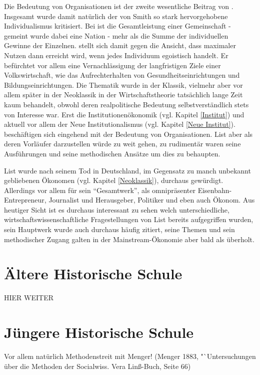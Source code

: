 Die Bedeutung von Organisationen ist der zweite wesentliche Beitrag von \textcite{List1841}. Insgesamt wurde damit natürlich der von Smith so stark hervorgehobene Individualismus kritisiert. Bei \textcite{List1841} ist die Gesamtleistung einer Gemeinschaft - gemeint wurde dabei eine Nation - mehr als die Summe der individuellen Gewinne der Einzelnen.  \textcite{List1841} stellt sich damit gegen die Ansicht, dass maximaler Nutzen dann erreicht wird, wenn jedes Individuum egoistisch handelt. Er befürchtet vor allem eine Vernachlässigung der langfristigen Ziele einer Volkswirtschaft, wie das Aufrechterhalten von Gesundheitseinrichtungen und Bildungseinrichtungen. Die Thematik wurde in der Klassik, vielmehr aber vor allem später in der Neoklassik in der Wirtschaftstheorie tatsächlich lange Zeit kaum behandelt, obwohl deren realpolitische Bedeutung selbstverständlich stets von Interesse war. Erst die Institutionenökonomik (vgl. Kapitel \ref{Institut}) und aktuell vor allem der Neue Institutionalismus (vgl. Kapitel \ref{Neue Institut}). beschäftigen sich eingehend mit der Bedeutung von Organisationen. List aber als deren Vorläufer darzustellen würde zu weit gehen, zu rudimentär waren seine Ausführungen und seine methodischen Ansätze um dies zu behaupten.

List wurde nach seinem Tod in Deutschland, im Gegensatz zu manch unbekannt gebliebenen Ökonomen (vgl. Kapitel \ref{Neoklassik}), durchaus gewürdigt. Allerdings vor allem für sein "`Gesamtwerk"', als omnipräsenter Eisenbahn-Entrepreneur, Journalist und Herausgeber, Politiker und eben auch Ökonom. Aus heutiger Sicht ist es durchaus interessant zu sehen welch unterschiedliche, wirtschaftswissenschaftliche Fragestellungen von List bereits aufgegriffen wurden, sein Hauptwerk \textcite{List1841} wurde auch durchaus häufig zitiert, seine Themen und sein methodischer Zugang galten in der Mainstream-Ökonomie aber bald als überholt.

\section{Ältere Historische Schule}
\label{Hist_Schulen}

HIER WEITER


\section{Jüngere Historische Schule}


Vor allem natürlich Methodenstreit mit Menger! (Menger 1883, "`Untersuchungen über die Methoden der Socialwiss. Vera Linß-Buch, Seite 66)

